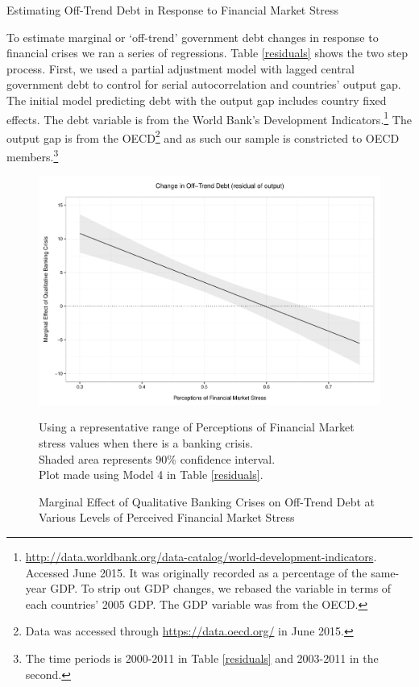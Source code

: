 \documentclass[]{article}
\begin{document}
\begin{table}
    \caption{Estimating Off-Trend Debt in Response to Financial Market Stress}
    \label{residuals}
        \begin{center}
            
        \end{center}
\end{table}

To estimate marginal or `off-trend' government debt changes in response to financial crises we ran a series of regressions. Table \ref{residuals} shows the two step process. First, we used a partial adjustment model with lagged central government debt to control for serial autocorrelation and countries' output gap. The initial model predicting debt with the output gap includes country fixed effects. The debt variable is from the World Bank's Development Indicators.\footnote{\url{http://data.worldbank.org/data-catalog/world-development-indicators}. Accessed June 2015. It was originally recorded as a percentage of the same-year GDP. To strip out GDP changes, we rebased
the variable in terms of each countries' 2005 GDP. The GDP variable was from the OECD.} The output gap is from the OECD\footnote{Data was accessed through \url{https://data.oecd.org/} in June 2015.} and as such our sample is constricted to OECD members.\footnote{The time periods is 2000-2011 in Table \ref{residuals} and 2003-2011 in the second.}

\begin{figure}
    \caption{Marginal Effect of Qualitative Banking Crises on Off-Trend Debt at Various Levels of Perceived Financial Market Stress}
    \label{me_stress_crisis}

    \begin{center}
        \includegraphics[scale=0.45]{analysis/figures/lv_epfms.pdf}
    \end{center}

    {\scriptsize{Using a representative range of Perceptions of Financial Market stress values when there is a \cite{laeven2013} banking crisis. \\
    Shaded area represents 90\% confidence interval. \\
    Plot made using Model 4 in Table \ref{residuals}.}}

\end{figure}
\end{document}
